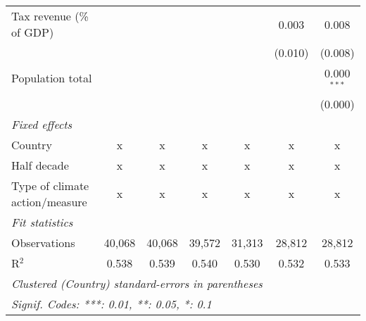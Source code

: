\begin{tabular}{lcccccc}
   Tax revenue (\% of GDP)              &         &               &               &               & 0.003         & 0.008\\   
                                        &         &               &               &               & (0.010)       & (0.008)\\   
   Population total                     &         &               &               &               &               & 0.000$^{***}$\\   
                                        &         &               &               &               &               & (0.000)\\   
   \emph{Fixed effects}\\
   Country                              & x       & x             & x             & x             & x             & x\\  
   Half decade                          & x       & x             & x             & x             & x             & x\\  
   Type of climate action/measure       & x       & x             & x             & x             & x             & x\\  
   \midrule \emph{Fit statistics}\\
   Observations                         & 40,068  & 40,068        & 39,572        & 31,313        & 28,812        & 28,812\\  
   R$^2$                                & 0.538   & 0.539         & 0.540         & 0.530         & 0.532         & 0.533\\  
   \midrule
   \multicolumn{7}{l}{\emph{Clustered (Country) standard-errors in parentheses}}\\
   \multicolumn{7}{l}{\emph{Signif. Codes: ***: 0.01, **: 0.05, *: 0.1}}\\
\end{tabular}
\par\endgroup


